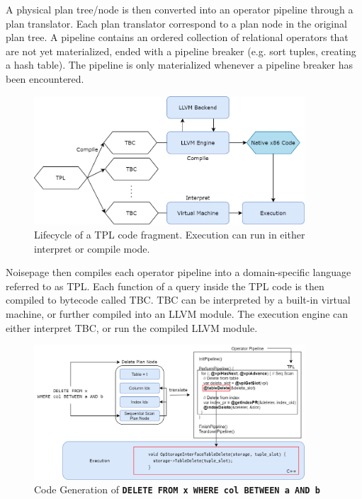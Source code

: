 \documentclass[12pt]{cmuthesis}
\newcommand{\dbSQL}[1]{\texttt{\textbf{#1}}\xspace}
\begin{document}
A physical plan tree/node is then converted into an operator pipeline through a plan translator. Each plan translator correspond to a plan node in the original plan tree. A pipeline contains an ordered collection of relational operators that are not yet materialized, ended with a pipeline breaker (e.g. sort tuples, creating a hash table). The pipeline is only materialized whenever a pipeline breaker has been encountered.

\begin{figure}[H]
\centering
\includegraphics[width=0.9\textwidth]{images/LLVM.png}
\caption{Lifecycle of a TPL code fragment. Execution can run in either interpret or compile mode.}
\label{fig:llvm}
\end{figure}
Noisepage then compiles each operator pipeline into a domain-specific language referred to as TPL. Each function of a query inside the TPL code is then compiled to bytecode called TBC. TBC can be interpreted by a built-in virtual machine, or further compiled into an LLVM module. The execution engine can either interpret TBC, or run the compiled LLVM module.

\begin{figure}[H]
\centering
\includegraphics[width=0.9\textwidth]{images/CodegenExample.png}
\caption{Code Generation of \dbSQL{DELETE FROM x WHERE col BETWEEN a AND b}}
\label{fig:codegen_example}
\end{figure}
\end{document}
